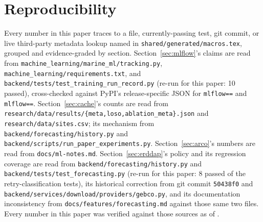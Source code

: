 \documentclass[conference]{IEEEtran}
\begin{document}


\section*{Reproducibility}
Every number in this paper traces to a file, currently-passing test, git
commit, or live third-party metadata lookup named in
\texttt{shared/generated/macros.tex}, grouped and evidence-graded by
section. Section~\ref{sec:mlflow}'s claims are read from
\texttt{machine\_learning/marine\_ml/tracking.py},
\texttt{machine\_learning/requirements.txt}, and
\texttt{backend/tests/test\_training\_run\_record.py} (re-run for this
paper: 10 passed), cross-checked against PyPI's release-specific JSON for
\texttt{mlflow==\MlflowMatchedVersion{}} and \texttt{mlflow==\MlflowLatestVersion{}}.
Section~\ref{sec:cache}'s counts are read from
\texttt{research/data/results/\{meta,loso,ablation\_meta\}.json} and
\texttt{research/data/sites.csv}; its mechanism from
\texttt{backend/forecasting/history.py} and
\texttt{backend/scripts/run\_paper\_experiments.py}. Section~\ref{sec:arco}'s
numbers are read from \texttt{docs/ml-notes.md}. Section~\ref{sec:erddap}'s
policy and its regression coverage are read from
\texttt{backend/forecasting/history.py} and
\texttt{backend/tests/test\_forecasting.py} (re-run for this paper: 8
passed of the retry-classification tests), its historical correction from
git commit \texttt{50438f0} and
\texttt{backend/services/download/providers/gebco.py}, and its documentation
inconsistency from \texttt{docs/features/forecasting.md} against those same
two files. Every number in this paper was verified against those sources as
of \AsOf{}.



\end{document}

